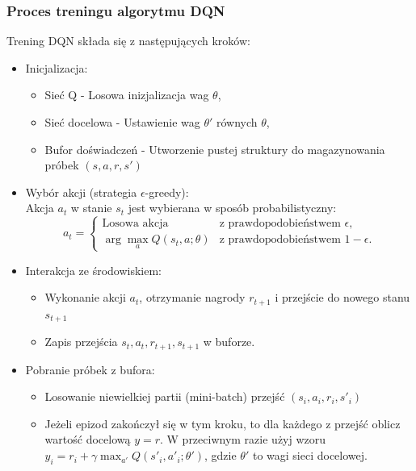 \documentclass[a4paper, 12pt]{article}
\numberwithin{equation}{section}
\begin{document}
    \subsubsection{Proces treningu algorytmu DQN}
    Trening DQN składa się z następujących kroków:
    \begin{itemize}
        \item Inicjalizacja:
        \begin{itemize}
            \item Sieć Q - Losowa inizjalizacja wag \( \theta \),
            \item Sieć docelowa - Ustawienie wag \( \theta' \) równych \( \theta \),
            \item Bufor doświadczeń - Utworzenie pustej struktury do magazynowania próbek \( (s,a,r,s') \)
        \end{itemize}
        \item Wybór akcji (strategia \( \epsilon \)-greedy): \\
        Akcja \( a_t \) w stanie \( s_t \) jest wybierana w sposób probabilistyczny:
        \[
        a_t =
        \begin{cases} 
        \text{Losowa akcja} & \text{z prawdopodobieństwem } \epsilon, \\
        \arg\max_{a} Q(s_t, a; \theta) & \text{z prawdopodobieństwem } 1 - \epsilon.
        \end{cases}
        \]
        \item Interakcja ze środowiskiem:
        \begin{itemize}
            \item Wykonanie akcji \( a_t \), otrzymanie nagrody \( r_{t+1} \) i przejście do nowego stanu \( s_{t+1} \)
            \item Zapis przejścia \( s_t, a_t, r_{t+1}, s_{t+1} \)  w buforze.
        \end{itemize}
        \item Pobranie próbek z bufora:
        \begin{itemize}
            \item Losowanie niewielkiej partii (mini-batch) przejść \( {(s_i, a_i, r_i, s'_i)} \)
            \item Jeżeli epizod zakończył się w tym kroku, to dla każdego z przejść oblicz wartość docelową \( y = r \). W przeciwnym razie użyj 
            wzoru \( y_i = r_i + \gamma \max_{a'} Q(s'_i, a'_i; \theta') \), gdzie \( \theta' \) to wagi sieci docelowej.
        \end{itemize}

\end{itemize}
\end{document}
